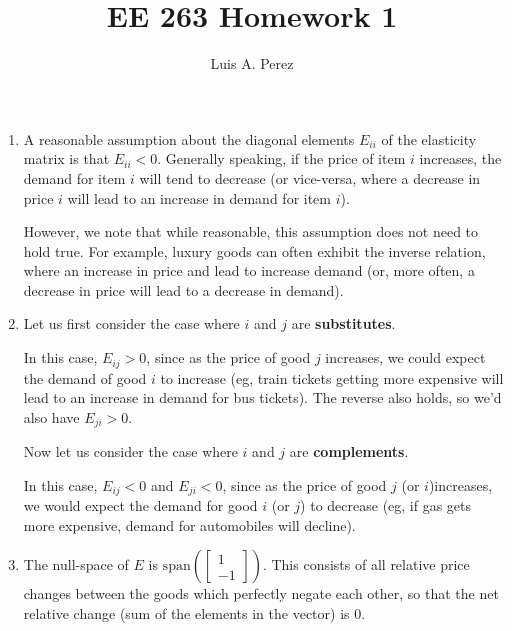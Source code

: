 \documentclass[12pt]{exam}
\newcommand*{\authorname}{Luis A. Perez}
\newcommand{\Q}[1]{\question{\large{\textbf{#1}}}}
\begin{document}
\title{EE 263 Homework 1}
\author{\authorname}
\date{}
\maketitle
\thispagestyle{headandfoot}
\setcounter{MaxMatrixCols}{15}

\begin{questions}
\Q{Price elasticity of demand}

\begin{solution}
  \begin{enumerate}[label=(\alph*)]
    \item A reasonable assumption about the diagonal elements $E_{ii}$ of the elasticity matrix is that $E_{ii} < 0$. Generally speaking, if the price of item $i$ increases, the demand for item $i$ will tend to decrease (or vice-versa, where a decrease in price $i$ will lead to an increase in demand for item $i$).

    However, we note that while reasonable, this assumption does not need to hold true. For example, luxury goods can often exhibit the inverse relation, where an increase in price and lead to increase demand (or, more often, a decrease in price will lead to a decrease in demand).

    \item Let us first consider the case where $i$ and $j$ are \textbf{substitutes}.

    In this case, $E_{ij} > 0$, since as the price of good $j$ increases, we could expect the demand of good $i$ to increase (eg, train tickets getting more expensive will lead to an increase in demand for bus tickets). The reverse also holds, so we'd also have $E_{ji} > 0$.

    Now let us consider the case where $i$ and $j$ are \textbf{complements}.

    In this case, $E_{ij} < 0$ and $E_{ji} < 0$, since as the price of good $j$ (or $i$)increases, we would expect the demand for good $i$ (or $j$) to decrease (eg, if gas gets more expensive, demand for automobiles will decline).

    \item The null-space of $E$ is $\text{span}\left(\begin{bmatrix}1 \\ -1 \end{bmatrix}\right)$. This consists of all relative price changes between the goods which perfectly negate each other, so that the net relative change (sum of the elements in the vector) is $0$.


\end{enumerate}
\end{solution}
\end{questions}
\end{document}

